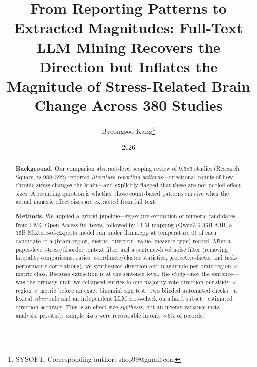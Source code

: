 \documentclass[11pt]{article}
\title{From Reporting Patterns to Extracted Magnitudes: Full-Text LLM Mining
Recovers the Direction but Inflates the Magnitude of Stress-Related Brain Change
Across 380 Studies}
\author{Byeongsoo Kang\thanks{SYSOFT. Corresponding author: shoo99@gmail.com}}
\date{2026}
\begin{document}
\maketitle

\begin{abstract}
\textbf{Background.} Our companion abstract-level scoping review of 9{,}585
studies (Research Square, rs-9884522) reported \emph{literature reporting
patterns}---directional counts of how chronic stress changes the brain---and
explicitly flagged that these are not pooled effect sizes. A recurring question
is whether those count-based patterns survive when the actual numeric effect
sizes are extracted from full text.

\textbf{Methods.} We applied a hybrid pipeline---regex pre-extraction of
numeric candidates from PMC Open Access full texts, followed by LLM mapping
(Qwen3.6-35B-A3B, a 35B Mixture-of-Experts model run under llama.cpp at
temperature 0) of each candidate to a (brain region, metric, direction, value,
measure type) record. After a paper-level stress/disorder context filter and a
sentence-level noise filter (removing laterality comparisons, ratios,
coordinate/cluster statistics, protective-factor and task-performance
correlations), we synthesized direction and magnitude per brain region $\times$
metric class. Because extraction is at the sentence level, the \emph{study}---not
the sentence---was the primary unit: we collapsed entries to one majority-vote
direction per study $\times$ region $\times$ metric before an exact binomial
sign test. Two blinded automated checks---a lexical \emph{silver} rule and an
independent LLM cross-check on a hard subset---estimated direction accuracy. This is an effect-size \emph{synthesis}, not an inverse-variance
meta-analysis: per-study sample sizes were recoverable in only $\sim$6\% of
records.


\end{abstract}
\end{document}
